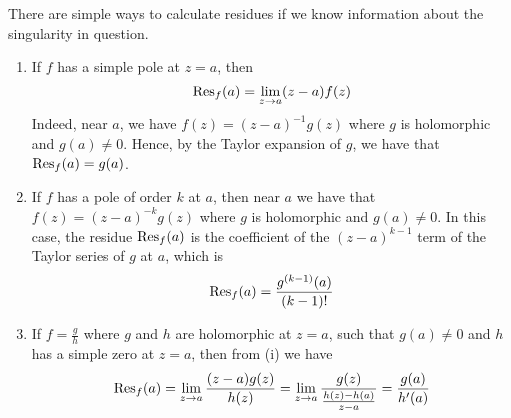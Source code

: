 There are simple ways to calculate residues if we know information about the singularity in question.
\begin{enumerate}
	\item If \( f \) has a simple pole at \( z = a \), then
	      \[
		      \Res_f(a) = \lim_{z \to a} (z-a) f(z)
	      \]
	      Indeed, near \( a \), we have \( f(z) = (z-a)^{-1} g(z) \) where \( g \) is holomorphic and \( g(a) \neq 0 \).
	      Hence, by the Taylor expansion of \( g \), we have that \( \Res_f(a) = g(a) \).
	\item If \( f \) has a pole of order \( k \) at \( a \), then near \( a \) we have that \( f(z) = (z-a)^{-k} g(z) \) where \( g \) is holomorphic and \( g(a) \neq 0 \).
	      In this case, the residue \( \Res_f(a) \) is the coefficient of the \( (z-a)^{k-1} \) term of the Taylor series of \( g \) at \( a \), which is
	      \[
		      \Res_f(a) = \frac{g^{(k-1)}(a)}{(k-1)!}
	      \]
	\item If \( f = \frac{g}{h} \) where \( g \) and \( h \) are holomorphic at \( z = a \), such that \( g(a) \neq 0 \) and \( h \) has a simple zero at \( z = a \), then from (i) we have
	      \[
		      \Res_f(a) = \lim_{z \to a} \frac{(z-a)g(z)}{h(z)} = \lim_{z \to a} \frac{g(z)}{\frac{h(z) - h(a)}{z-a}} = \frac{g(a)}{h'(a)}
	      \]
\end{enumerate}
